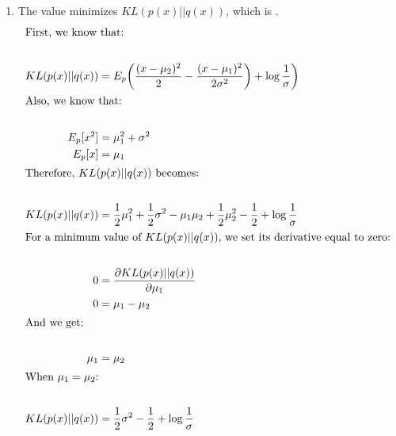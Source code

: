 \documentclass[english]{article}
\begin{document}
\begin{enumerate}
  \item The value \underline{} minimizes $KL(p(x)||q(x))$, which is \underline{}.
    \begin{align*}
    \intertext{First, we know that:} \\
      KL(p(x)||q(x)) = &\; E_p\bigg( \dfrac{(x - \mu_{2})^2}{2} - \dfrac{(x - \mu_{1})^2}{2\sigma^2} \bigg) + \log \dfrac{1}{\sigma} \bigg) \\
    \intertext{Also, we know that:} \\
      E_p[x^2]= &\; \mu_{1}^2 + \sigma^2 \\
      E_p[x]= &\; \mu_{1} \\
    \intertext{Therefore, $KL(p(x)||q(x))$ becomes:} \\
      KL(p(x)||q(x))= &\; \dfrac{1}{2} \mu_{1}^2 + \dfrac{1}{2}\sigma^2 - \mu_{1}\mu_{2} + \dfrac{1}{2} \mu_{2}^2 - \dfrac{1}{2} + \log \dfrac{1}{\sigma} \\
    \intertext{For a minimum value of $KL(p(x)||q(x))$, we set its derivative equal to zero:} \\
      0 =&\; \frac{\partial KL(p(x) || q(x))}{\partial \mu_1} \\
      0 =&\; \mu_{1} - \mu_{2} \\
    \intertext{And we get:}\\
      \mu_1 = &\; \mu_2 \\
    \intertext{When $\mu_1 = \mu_2$:} \\
    KL(p(x)||q(x))= &\; \dfrac{1}{2}\sigma^2 - \dfrac{1}{2} + \log \dfrac{1}{\sigma}
    \end{align*}
  \end{enumerate}
\end{document}
